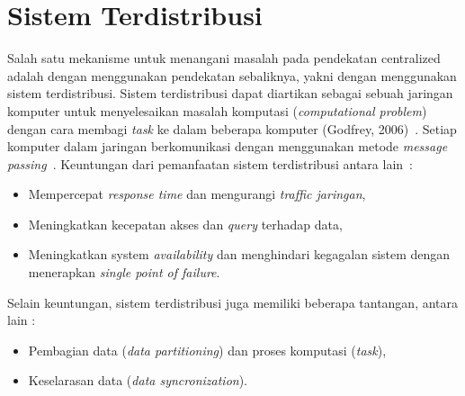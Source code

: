 \section{Sistem Terdistribusi}
Salah satu mekanisme untuk menangani masalah pada pendekatan centralized adalah dengan menggunakan pendekatan sebaliknya, yakni dengan menggunakan sistem terdistribusi. Sistem terdistribusi dapat diartikan sebagai sebuah jaringan komputer untuk menyelesaikan masalah komputasi (\textit{computational problem}) dengan cara membagi \textit{task} ke dalam beberapa komputer (Godfrey, 2006)~\cite{_primer_????}. Setiap komputer dalam jaringan berkomunikasi dengan menggunakan metode \textit{message passing}~\cite{andrews_foundations_1999}. Keuntungan dari pemanfaatan sistem terdistribusi antara lain~\cite{takdir_multi-layer_2014}:
\begin{itemize}
\item Mempercepat \textit{response time} dan mengurangi \textit{traffic jaringan}, 
\item Meningkatkan kecepatan akses dan \textit{query} terhadap data, 
\item Meningkatkan system \textit{availability} dan menghindari kegagalan sistem dengan menerapkan \textit{single point of failure}.
\end{itemize}
Selain keuntungan, sistem terdistribusi juga memiliki beberapa tantangan, antara lain :
\begin{itemize}
\item Pembagian data (\textit{data partitioning}) dan proses komputasi (\textit{task}), 
\item Keselarasan data (\textit{data syncronization}).
\end{itemize}

